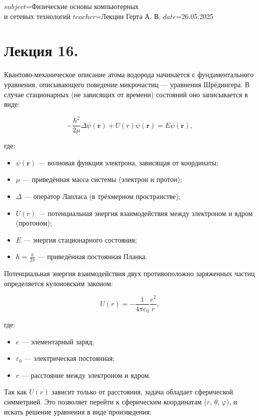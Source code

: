 $subject$=Физические основы компьютерных \\ и сетевых технологий
$teacher$=Лекции Герта А. В.
$date$=26.05.2025

\section{Лекция 16. }

Квантово-механическое описание атома водорода начинается с фундаментального уравнения, описывающего поведение микрочастиц — уравнения Шрёдингера. В случае стационарных (не зависящих от времени) состояний оно записывается в виде:

\[
- \frac{\hbar^2}{2\mu} \Delta \psi(\mathbf{r}) + U(r) \psi(\mathbf{r}) = E \psi(\mathbf{r}),
\]

где:

\begin{itemize}
    \item $\psi(\mathbf{r})$ — волновая функция электрона, зависящая от координаты;
    \item $\mu$ — приведённая масса системы (электрон и протон);
    \item $\Delta$ — оператор Лапласа (в трёхмерном пространстве);
    \item $U(r)$ — потенциальная энергия взаимодействия между электроном и ядром (протоном);
    \item $E$ — энергия стационарного состояния;
    \item $\hbar = \frac{h}{2\pi}$ — приведённая постоянная Планка.
\end{itemize}

Потенциальная энергия взаимодействия двух противоположно заряженных частиц определяется кулоновским законом:

\[
U(r) = -\frac{1}{4\pi \varepsilon_0} \frac{e^2}{r},
\]

где:

\begin{itemize}
    \item $e$ — элементарный заряд;
    \item $\varepsilon_0$ — электрическая постоянная;
    \item $r$ — расстояние между электроном и ядром.
\end{itemize}

Так как $U(r)$ зависит только от расстояния, задача обладает сферической симметрией. Это позволяет перейти к сферическим координатам ($r$, $\theta$, $\varphi$), и искать решение уравнения в виде произведения:

